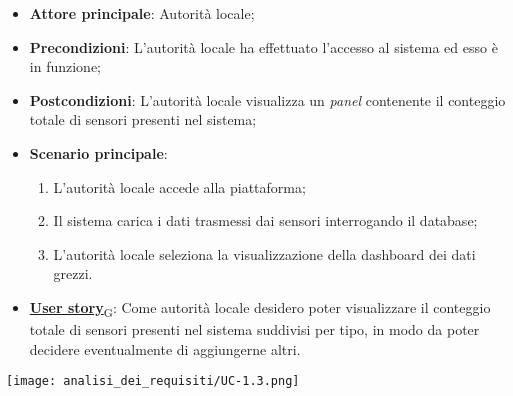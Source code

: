 \begin{itemize}
	\item \textbf{Attore principale}: Autorità locale;
	\item \textbf{Precondizioni}: L'autorità locale ha effettuato l'accesso al sistema ed esso è in funzione;
	\item \textbf{Postcondizioni}: L'autorità locale visualizza un \textit{panel} contenente il conteggio totale di sensori presenti nel sistema;
	\item \textbf{Scenario principale}:
	      \begin{enumerate}
		      \item L'autorità locale accede alla piattaforma;
		      \item Il sistema carica i dati trasmessi dai sensori interrogando il database;
		      \item L'autorità locale seleziona la visualizzazione della dashboard dei dati grezzi.
	      \end{enumerate}
	\item \href{https://7last.github.io/docs/rtb/documentazione-interna/glossario\#user-story}{\textbf{User story}\textsubscript{G}}:
	      Come autorità locale desidero poter visualizzare il conteggio totale di sensori presenti nel sistema suddivisi per tipo, in modo da poter decidere eventualmente di aggiungerne altri.
\end{itemize}
\begin{center}
	\texttt{[image: analisi\_dei\_requisiti/UC-1.3.png]}
\end{center}

